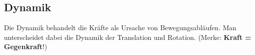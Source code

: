 \subsection{Dynamik}
Die Dynamik behandelt die Kräfte als Ursache von Bewegungsabläufen. Man unterscheidet dabei die Dynamik der Translation und Rotation. (Merke: \textbf{Kraft = Gegenkraft}!)






\clearpage






